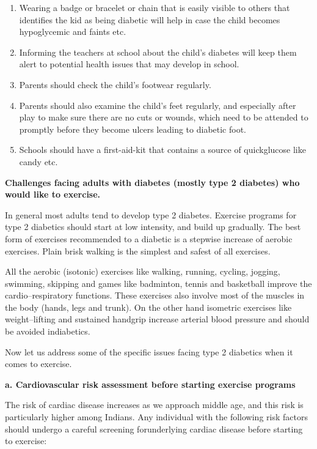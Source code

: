 \begin{enumerate}[•]
\itemsep=0pt
\item Wearing a badge or bracelet or chain that is easily visible to others that identifies the kid as being diabetic will help in case the child becomes hypoglycemic and faints etc.
\item Informing the teachers at school about the child’s diabetes will keep them alert to potential health issues that may develop in school.
\item Parents should check the child’s footwear regularly.
\item Parents should also examine the child’s feet regularly, and especially after play to make sure there are no cuts or wounds, which need to be attended to promptly before they become ulcers leading to diabetic foot.
\item Schools should have a first-aid-kit that contains a source of quick\break glucose like candy etc.
\end{enumerate}

\noindent\textbf{Challenges facing adults with diabetes (mostly type 2 diabetes) who would like to exercise.}

In general most adults tend to develop type 2 diabetes. Exercise programs for type 2 diabetics should start at low intensity, and build up gradually. The best form of exercises recommended to a diabetic is a stepwise increase of aerobic exercises. Plain brisk walking is the simplest and safest of all exercises.

All the aerobic (isotonic) exercises like walking, running, cycling, jogging, swimming, skipping and games like badminton, tennis and basketball improve the cardio–respiratory functions. These exercises also involve most of the muscles in the body (hands, legs and trunk). On the other hand isometric exercises like weight–lifting and sustained handgrip increase arterial blood pressure and should be avoided in\break diabetics.

Now let us address some of the specific issues facing type 2 dia\-betics when it comes to exercise.

\noindent\textbf{a. Cardiovascular risk assessment before starting exercise programs}

The risk of cardiac disease increases as we approach middle age, and this risk is particularly higher among Indians. Any individual with the following risk factors should undergo a careful screening for\break underlying cardiac disease before starting to exercise:

